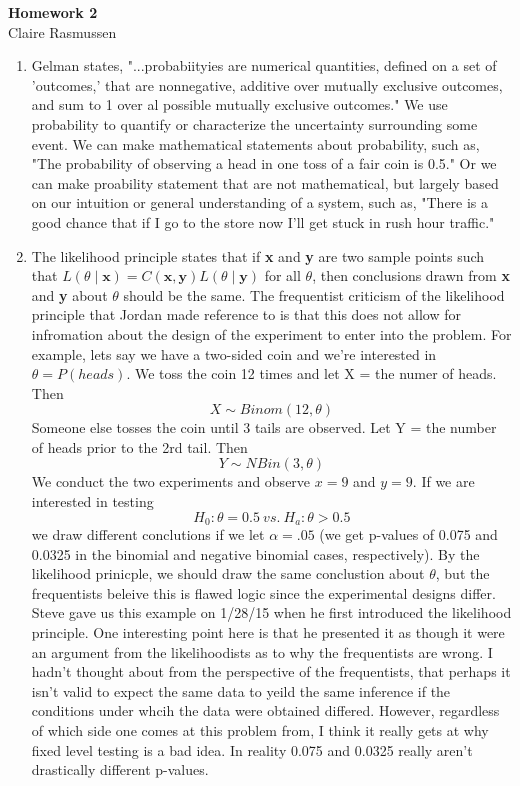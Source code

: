 \documentclass[12pt]{article}\usepackage[]{graphicx}\usepackage[]{color}
\begin{document}
\large
\begin{center}
{\Large \bf  Homework 2}\\
Claire Rasmussen
\end{center}



\small
\begin{enumerate}
\item Gelman states, "...probabiityies are numerical quantities, defined on a set of 'outcomes,' that are nonnegative, additive over mutually exclusive outcomes, and sum to 1 over al possible mutually exclusive outcomes." We use probability to quantify or characterize the uncertainty surrounding some event. We can make mathematical statements about probability, such as, "The probability of observing a head in one toss of a fair coin is 0.5." Or we can make proability statement that are not mathematical, but largely based on our intuition or general understanding of a system, such as, "There is a good chance that if I go to the store now I'll get stuck in rush hour traffic." 

\item The likelihood principle states that if {\bf x} and {\bf y} are two sample points such that $L(\theta \mid \mathbf{x}) = C(\mathbf{x,y})L(\theta \mid \mathbf{y})$ for all $
\theta$, then conclusions drawn from {\bf x} and {\bf y} about $\theta$ should be the same. The frequentist criticism of the likelihood principle that Jordan made reference to is that this does not allow for infromation about the design of the experiment to enter into the problem. For example, lets say we have a two-sided coin and we're interested in $\theta=P(heads)$. We toss the coin 12 times and let X = the numer of heads. Then $$X \sim Binom(12, \theta)$$ Someone else tosses the coin until 3 tails are observed. Let Y = the number of heads prior to the 2rd tail. Then $$Y \sim NBin(3, \theta)$$ We conduct the two experiments and observe $x=9$ and $y=9$. If we are interested in testing $$H_0: \theta = 0.5 ~vs.~ H_a: \theta > 0.5$$  we draw different conclutions if we let $\alpha=.05$ (we get p-values of 0.075 and 0.0325 in the binomial and negative binomial cases, respectively). By the likelihood prinicple, we should draw the same conclustion about $\theta$, but the frequentists beleive this is flawed logic since the experimental designs differ. Steve gave us this example on 1/28/15 when he first introduced the likelihood principle. One interesting point here is that he presented it as though it were an argument from the likelihoodists as to why the frequentists are wrong. I hadn't thought about from the perspective of the frequentists, that perhaps it isn't valid to expect the same data to yeild the same inference if the conditions under whcih the data were obtained differed. However, regardless of which side one comes at this problem from, I think it really gets at why fixed level testing is a bad idea. In reality 0.075 and 0.0325 really aren't drastically different p-values.


\end{enumerate}
\end{document}
